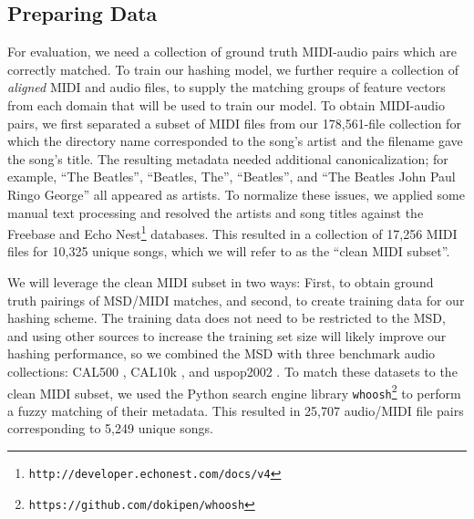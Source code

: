 \subsection{Preparing Data}
\label{sec:training_data}

For evaluation, we need a collection of ground truth MIDI-audio pairs which are correctly matched.
To train our hashing model, we further require a collection of {\em aligned} MIDI and audio files, to supply the matching groups of feature vectors from each domain that will be used to train our model.
To obtain MIDI-audio pairs, we first separated a subset of MIDI files from our 178,561-file collection for which the directory name corresponded to the song's artist and the filename gave the song's title.
The resulting metadata needed additional canonicalization; for example, ``The Beatles'', ``Beatles, The'', ``Beatles'', and ``The Beatles John Paul Ringo George'' all appeared as artists.
To normalize these issues, we applied some manual text processing and resolved the artists and song titles against the Freebase \cite{bollacker2008freebase} and Echo Nest\footnote{\texttt{http://developer.echonest.com/docs/v4}} databases.
This resulted in a collection of 17,256 MIDI files for 10,325 unique songs, which we will refer to as the ``clean MIDI subset''.

We will leverage the clean MIDI subset in two ways: First, to obtain ground truth pairings of MSD/MIDI matches, and second, to create training data for our hashing scheme.
The training data does not need to be restricted to the MSD, and using other sources to increase the training set size will likely improve our hashing performance, so we combined the MSD with three benchmark audio collections: CAL500 \cite{turnbull2007towards}, CAL10k \cite{tingle2010exploring}, and uspop2002 \cite{berenzweig2004large}.
To match these datasets to the clean MIDI subset, we used the Python search engine library \texttt{whoosh}\footnote{\texttt{https://github.com/dokipen/whoosh}} to perform a fuzzy matching of their metadata.
This resulted in 25,707 audio/MIDI file pairs corresponding to 5,249 unique songs.

